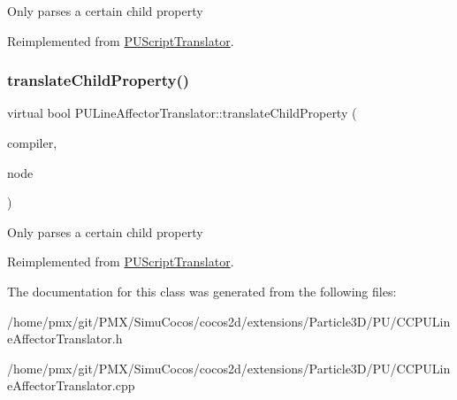 Only parses a certain child property 

Reimplemented from \hyperlink{classPUScriptTranslator_a0374d83a8a04e57918975d525e0f8fe8}{P\+U\+Script\+Translator}.

\mbox{\label{classPULineAffectorTranslator_a319bd33109dfb7ea8dc20cee66717644}} 
\subsubsection{\texorpdfstring{translate\+Child\+Property()}{translateChildProperty()}\hspace{0.1cm}{\footnotesize\ttfamily [2/2]}}
{\footnotesize\ttfamily virtual bool P\+U\+Line\+Affector\+Translator\+::translate\+Child\+Property (\begin{DoxyParamCaption}\item[{\hyperlink{classPUScriptCompiler}{P\+U\+Script\+Compiler} $\ast$}]{compiler,  }\item[{\hyperlink{classPUAbstractNode}{P\+U\+Abstract\+Node} $\ast$}]{node }\end{DoxyParamCaption})\hspace{0.3cm}{\ttfamily [virtual]}}

Only parses a certain child property 

Reimplemented from \hyperlink{classPUScriptTranslator_a0374d83a8a04e57918975d525e0f8fe8}{P\+U\+Script\+Translator}.



The documentation for this class was generated from the following files\+:\begin{DoxyCompactItemize}
\item 
/home/pmx/git/\+P\+M\+X/\+Simu\+Cocos/cocos2d/extensions/\+Particle3\+D/\+P\+U/C\+C\+P\+U\+Line\+Affector\+Translator.\+h\item 
/home/pmx/git/\+P\+M\+X/\+Simu\+Cocos/cocos2d/extensions/\+Particle3\+D/\+P\+U/C\+C\+P\+U\+Line\+Affector\+Translator.\+cpp\end{DoxyCompactItemize}
